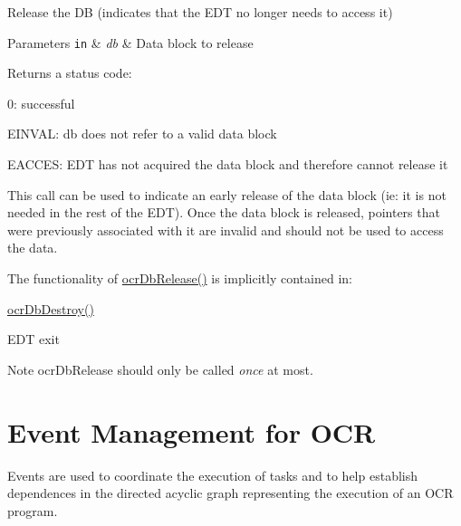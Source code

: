 Release the D\-B (indicates that the E\-D\-T no longer needs to access it)


\begin{DoxyParams}[1]{Parameters}
\mbox{\tt in}  & {\em db} & Data block to release\\
\hline
\end{DoxyParams}
\begin{DoxyReturn}{Returns}
a status code\-:
\begin{DoxyItemize}
\item 0\-: successful
\item E\-I\-N\-V\-A\-L\-: db does not refer to a valid data block
\item E\-A\-C\-C\-E\-S\-: E\-D\-T has not acquired the data block and therefore cannot release it
\end{DoxyItemize}
\end{DoxyReturn}

\descr
This call can be used to indicate an early release of the data block (ie\-: it is not needed in the rest of the E\-D\-T). Once the data block is released, pointers that were previously associated with it are invalid and should not be used to access the data.

The functionality of \hyperlink{group__OCRDataBlock_ga2ec03c0b0998bdaf9ccc44a06fb05ca0}{ocr\-Db\-Release()} is implicitly contained in\-:
\begin{DoxyItemize}
\item \hyperlink{group__OCRDataBlock_gabc80ea5594e5e55a541a1df4c7727821}{ocr\-Db\-Destroy()}
\item E\-D\-T exit
\end{DoxyItemize}

\begin{DoxyNote}{Note}
ocr\-Db\-Release should only be called {\itshape once} at most.
\end{DoxyNote}

\section{Event Management for OCR}
\label{sec:OCReventManagement}

Events are  used to coordinate the execution of tasks and to
help establish dependences in the directed acyclic graph representing the execution of an OCR program.


